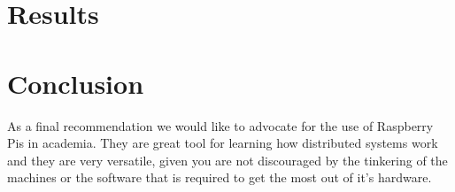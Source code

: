 \documentclass[10pt,a4paper]{article}
\begin{document}
\section{Results}
\section{Conclusion}

As a final recommendation we would like to advocate for the use of Raspberry Pis in academia. They are great tool for learning how distributed systems work and they are very versatile, given you are not discouraged by the tinkering of the machines or the software that is required to get the most out of it's hardware.


\newpage
{}


\nocite{*}
\end{document}
